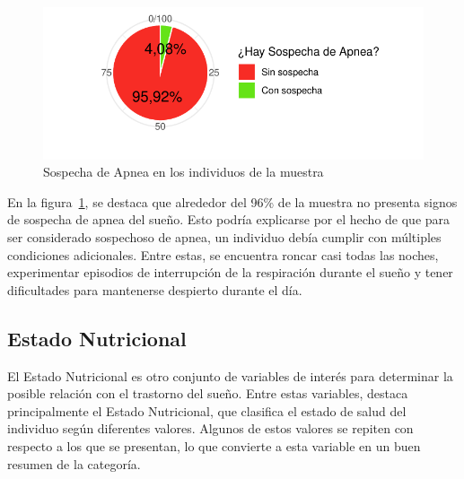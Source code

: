 \documentclass[
  10pt,
  letterpaper,
  DIV=11,
  numbers=noendperiod,
  twocolumn]{scrartcl}
\begin{document}
\begin{figure}[H]

{\centering \includegraphics{informe_estadistico_files/figure-pdf/fig-f3-1.pdf}

}

\caption{\label{fig-f3}Sospecha de Apnea en los individuos de la
muestra}

\end{figure}

En la figura~\ref{fig-f3}, se destaca que alrededor del 96\% de la
muestra no presenta signos de sospecha de apnea del sueño. Esto podría
explicarse por el hecho de que para ser considerado sospechoso de apnea,
un individuo debía cumplir con múltiples condiciones adicionales. Entre
estas, se encuentra roncar casi todas las noches, experimentar episodios
de interrupción de la respiración durante el sueño y tener dificultades
para mantenerse despierto durante el día.

\hypertarget{estado-nutricional}{%
\subsection{Estado Nutricional}\label{estado-nutricional}}

El Estado Nutricional es otro conjunto de variables de interés para
determinar la posible relación con el trastorno del sueño. Entre estas
variables, destaca principalmente el Estado Nutricional, que clasifica
el estado de salud del individuo según diferentes valores. Algunos de
estos valores se repiten con respecto a los que se presentan, lo que
convierte a esta variable en un buen resumen de la categoría.
\end{document}
